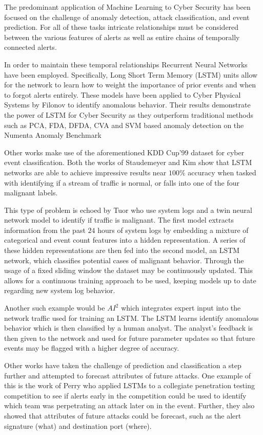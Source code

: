 \documentclass[12pt,american]{report}
\begin{document}
The predominant application of Machine Learning to Cyber Security has been focused on the challenge of anomaly detection, attack classification, and event prediction. For all of these tasks intricate relationships must be considered between the various features of alerts as well as entire chains of temporally connected alerts. 

In order to maintain these temporal relationships Recurrent Neural Networks have been employed. Specifically, Long Short Term Memory (LSTM) units allow for the network to learn how to weight the importance of prior events and when to forgot alerts entirely. These models have been applied to Cyber Physical Systems by Filonov \etal to identify anomalous behavior. Their results demonstrate the power of LSTM for Cyber Security as they outperform traditional methods such as PCA, FDA, DFDA, CVA and SVM based anomaly detection \cite{Filonov2016, Filonov2017} on the Numenta Anomaly Benchmark \cite{Lavin2015}

Other works make use of the aforementioned KDD Cup'99 dataset for cyber event classification. Both the works of Staudemeyer \etal \cite{Staudemeyer} and Kim \etal \cite{Kim} show that LSTM networks are able to achieve impressive results near $100\%$ accuracy when tasked with identifying if a stream of traffic is normal, or falls into one of the four malignant labels. 

This type of problem is echoed by Tuor \etal \cite{Tuor} who use system logs and a twin neural network model to identify if traffic is malignant. The first model extracts information from the past $24$ hours of system logs by embedding a mixture of categorical and event count features into a hidden representation. A series of these hidden representations are then fed into the second model, an LSTM network, which classifies potential cases of malignant behavior. Through the usage of a fixed sliding window the dataset may be continuously updated. This allows for a continuous training approach to be used, keeping models up to date regarding new system log behavior. 

Another such example would be $AI^2$ \cite{Veeramachaneni2016} which integrates expert input into the network traffic used for training an LSTM. The LSTM learns identify anomalous behavior which is then classified by a human analyst. The analyst's feedback is then given to the network and used for future parameter updates so that future events may be flagged with a higher degree of accuracy.

Other works have taken the challenge of prediction and classification a step further and attempted to forecast attributes of future attacks. One example of this is the work of Perry \etal \cite{us} who applied LSTMs to a collegiate penetration testing competition to see if alerts early in the competition could be used to identify which team was perpetrating an attack later on in the event. Further, they also showed that attributes of future attacks could be forecast, such as the alert signature (what) and destination port (where). 
\end{document}
